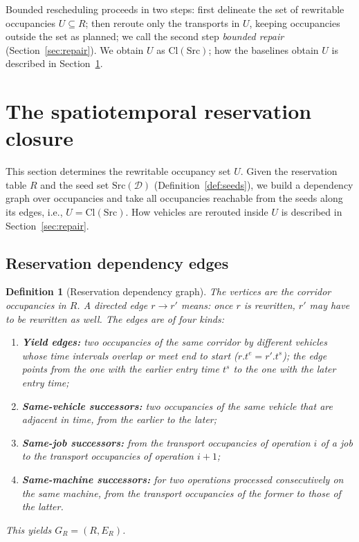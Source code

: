 \documentclass[manuscript,screen,review]{acmart}
\newtheorem{definition}{Definition}
\begin{document}
Bounded rescheduling proceeds in two steps: first delineate the set of rewritable occupancies \(U\subseteq R\);
then reroute only the transports in \(U\), keeping occupancies outside the set as planned; we call the second step \emph{bounded repair} (Section~\ref{sec:repair}).
We obtain \(U\) as \(\mathrm{Cl}(\mathrm{Src})\); how the baselines obtain \(U\) is described in Section~\ref{sec:strc}.

\section{The spatiotemporal reservation closure}
\label{sec:strc}

This section determines the rewritable occupancy set \(U\). Given the reservation table \(R\) and the seed set \(\mathrm{Src}(\mathcal{D})\)
(Definition~\ref{def:seeds}), we build a dependency graph over occupancies and take all occupancies reachable from the seeds along its edges, i.e., \(U=\mathrm{Cl}(\mathrm{Src})\).
How vehicles are rerouted inside \(U\) is described in Section~\ref{sec:repair}.

\subsection{Reservation dependency edges}
\label{sec:closure_def}

\begin{definition}[Reservation dependency graph]
\label{def:dep}
The vertices are the corridor occupancies in \(R\). A directed edge \(r\to r'\) means: once \(r\) is rewritten, \(r'\) may have to be rewritten as well. The edges are of four kinds:
\begin{enumerate}[leftmargin=1.4em,itemsep=0.15em]
\item \textbf{Yield edges:} two occupancies of the same corridor by different vehicles whose time intervals overlap or meet end to start (\(r.t^e=r'.t^s\));
the edge points from the one with the earlier entry time \(t^s\) to the one with the later entry time;
\item \textbf{Same-vehicle successors:} two occupancies of the same vehicle that are adjacent in time, from the earlier to the later;
\item \textbf{Same-job successors:} from the transport occupancies of operation \(i\) of a job to the transport occupancies of operation \(i+1\);
\item \textbf{Same-machine successors:} for two operations processed consecutively on the same machine, from the transport occupancies of the former to those of the latter.
\end{enumerate}
This yields \(G_R=(R,E_R)\).
\end{definition}
\end{document}
